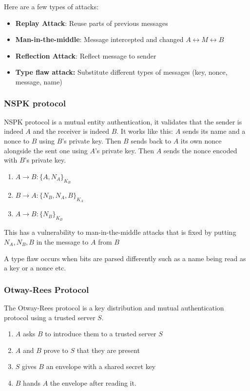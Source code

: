 \documentclass[11pt]{article}
\begin{document}
Here are a few types of attacks:
\begin{itemize}
    \item \textbf{Replay Attack}: Reuse parts of previous messages
    \item \textbf{Man-in-the-middle}: Message intercepted and changed $A\leftrightarrow M \leftrightarrow B$
    \item \textbf{Reflection Attack}: Reflect message to sender
    \item \textbf{Type flaw attack:} Substitute different types of messages (key, nonce, message, name)
\end{itemize}

\subsubsection{NSPK protocol}
NSPK protocol is a mutual entity authentication, it validates that the sender is indeed $A$ and the receiver is indeed $B$.
It works like this: $A$ sends its name and a nonce to $B$ using $B$'s private key.
Then $B$ sends back to $A$ its own nonce alongside the sent one using $A$'s private key.
Then $A$ sends the nonce encoded with $B$'s private key.
\begin{enumerate}
    \item $A \rightarrow B : \{ A, N_A \}_{K_B}$
    \item $B \rightarrow A : \{ N_B, N_A, B \}_{K_A}$
    \item $A \rightarrow B : \{ N_B \}_{K_B} $
\end{enumerate}

This has a vulnerability to man-in-the-middle attacks  that is fixed by putting $N_A,N_B, B$ in the message to $A$ from $B$

A type flaw occurs when bits are parsed differently such as a name being read as a key or a nonce etc.

\subsubsection{Otway-Rees Protocol}
The Otway-Rees protocol is a key distribution and mutual authentication protocol using a trusted server $S$.
\begin{enumerate}
    \item $A$ asks $B$ to introduce them to a trusted server $S$
    \item $A$ and $B$ prove to $S$ that they are present
    \item $S$ gives $B$ an envelope with a shared secret key
    \item $B$ hands $A$ the envelope after reading it.
\end{enumerate}
\end{document}
